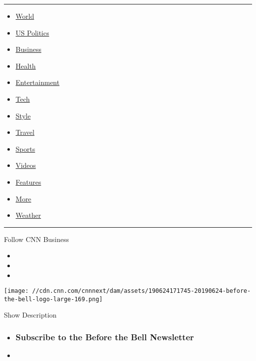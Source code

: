 \begin{center}\rule{0.5\linewidth}{\linethickness}\end{center}

\begin{itemize}
\tightlist
\item
  \href{/world}{World}
\item
  \href{/politics}{US Politics}
\item
  \href{/business}{Business}
\item
  \href{/health}{Health}
\item
  \href{/entertainment}{Entertainment}
\item
  \href{/business/tech}{Tech}
\item
  \href{/style}{Style}
\item
  \href{/travel}{Travel}
\item
  \href{/sport}{Sports}
\item
  \href{/videos}{Videos}
\item
  \href{/specials}{Features}
\item
  \href{/more}{More}
\item
  \href{/weather}{Weather}
\end{itemize}

\begin{center}\rule{0.5\linewidth}{\linethickness}\end{center}

Follow CNN Business

\begin{itemize}
\item
\item
\item
\end{itemize}

\texttt{[image: //cdn.cnn.com/cnnnext/dam/assets/190624171745-20190624-before-the-bell-logo-large-169.png]}

Show Description

\begin{itemize}
\item
  \hypertarget{subscribe-to-the-before-the-bell-newsletter}{%
  \subsubsection{Subscribe to the Before the Bell
  Newsletter}\label{subscribe-to-the-before-the-bell-newsletter}}
\item
\end{itemize}

